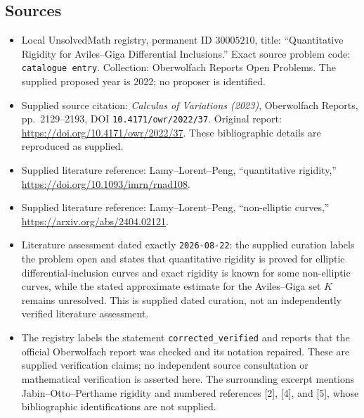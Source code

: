 \documentclass[11pt]{article}
\begin{document}
\subsection{Sources}
\begin{itemize}
\item Local UnsolvedMath registry, permanent ID \(30005210\), title: ``Quantitative Rigidity for Aviles--Giga Differential Inclusions.'' Exact source problem code: \texttt{catalogue entry}. Collection: Oberwolfach Reports Open Problems. The supplied proposed year is 2022; no proposer is identified.
\item Supplied source citation: \emph{Calculus of Variations (2023)}, Oberwolfach Reports, pp.~2129--2193, DOI \texttt{10.4171/owr/2022/37}. Original report: \url{https://doi.org/10.4171/owr/2022/37}. These bibliographic details are reproduced as supplied.
\item Supplied literature reference: Lamy--Lorent--Peng, ``quantitative rigidity,'' \url{https://doi.org/10.1093/imrn/rnad108}.
\item Supplied literature reference: Lamy--Lorent--Peng, ``non-elliptic curves,'' \url{https://arxiv.org/abs/2404.02121}.
\item Literature assessment dated exactly \texttt{2026-08-22}: the supplied curation labels the problem open and states that quantitative rigidity is proved for elliptic differential-inclusion curves and exact rigidity is known for some non-elliptic curves, while the stated approximate estimate for the Aviles--Giga set \(K\) remains unresolved. This is supplied dated curation, not an independently verified literature assessment.
\item The registry labels the statement \texttt{corrected\_verified} and reports that the official Oberwolfach report was checked and its notation repaired. These are supplied verification claims; no independent source consultation or mathematical verification is asserted here. The surrounding excerpt mentions Jabin--Otto--Perthame rigidity and numbered references [2], [4], and [5], whose bibliographic identifications are not supplied.
\end{itemize}
\end{document}
